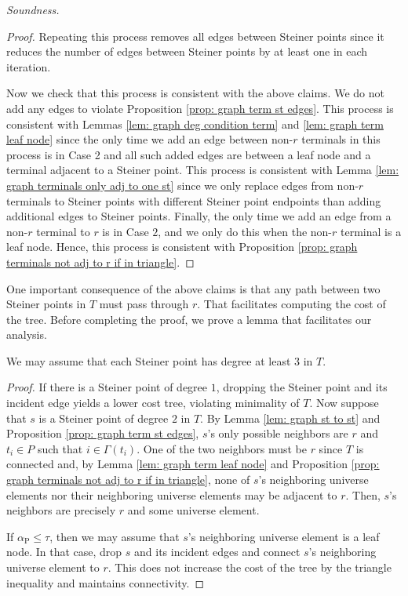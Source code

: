\documentclass{article}\providecommand{\DeclareRedundantLanguages}[2]{}\usepackage[a4paper,margin=20mm]{geometry}
\newcommand{\1}{\textbf{1}}
\newcommand{\td}{\tau}
\newcommand{\trd}{\alpha_{\text{P}}}
\begin{document}
\begin{paragraph}{\textit{Soundness.}}
\begin{proof}
  Repeating this process removes all edges between Steiner points since it reduces the number of edges between Steiner points by at least one in each iteration. 
  
  Now we check that this process is consistent with the above claims. We do not add any edges to violate Proposition \ref{prop: graph term st edges}.  This process is consistent with Lemmas \ref{lem: graph deg condition term} and \ref{lem: graph term leaf node}  since the only time we add an edge between non-$r$ terminals in this process is in Case 2 and all such added edges are between a leaf node and a terminal adjacent to a Steiner point. This process is consistent with Lemma \ref{lem: graph terminals only adj to one st} since we only replace edges from non-$r$ terminals to Steiner points with different Steiner point endpoints than adding additional edges to Steiner points. Finally, the only time we add an edge from a non-$r$ terminal to $r$ is in Case $2$, and we only do this when the non-$r$ terminal is a leaf node. Hence, this process is consistent with Proposition \ref{prop: graph terminals not adj to r if in triangle}.
 \end{proof}
 
One important consequence of the above claims is that any path between two Steiner points in $T$ must pass through $r$. That facilitates computing the cost of the tree. Before completing the proof, we prove a lemma that facilitates our analysis. 

\begin{lemma} \label{lem: graph st deg at least 3}
We may assume that each Steiner point has degree at least $3$ in $T$.
\end{lemma}
\begin{proof}
 If there is a Steiner point of degree $1$, dropping the Steiner point and its incident edge yields a lower cost tree, violating minimality of $T$. Now suppose that $s$ is a Steiner point of degree $2$ in $T$. By Lemma \ref{lem: graph st to st} and Proposition \ref{prop: graph term st edges}, $s$'s only possible neighbors are $r$ and $t_i \in P$ such that $i \in \Gamma(t_i)$. One of the two neighbors must be $r$ since $T$ is connected and, by Lemma \ref{lem: graph term leaf node} and Proposition \ref{prop: graph terminals not adj to r if in triangle}, none of $s$'s neighboring universe elements nor their neighboring universe elements may be adjacent to $r$. Then, $s$'s neighbors are precisely $r$ and some universe element. 

If $\trd \leq \td$, then we may assume that $s$'s neighboring universe element is a leaf node. In that case, drop $s$ and its incident edges and connect $s$'s neighboring universe element to $r$. This does not increase the cost of the tree by the triangle inequality and maintains connectivity.


\end{proof}
\end{paragraph}
\end{document}
